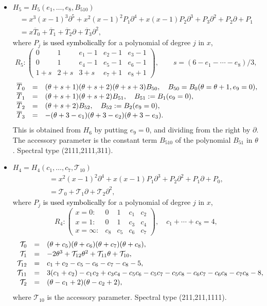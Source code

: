 \documentclass[a4paper,12pt]{article}
\theoremstyle{definition}
\theoremstyle{remark}
\numberwithin{equation}{section} %
\newcommand{\blue}[1]{\textcolor{black}{#1}}
\begin{document}
\begin{itemize}[leftmargin=*]
\item $H_5=H_5(e_1,\dots,e_8,B_{510})$
  $$\begin{array}{l}=x^3(x-1)^3\partial^5+x^2(x-1)^2P_1\partial^4+x(x-1)P_2\partial^3+P_3\partial^2+P_2\partial+P_1\\[2mm]
  =x\overline{T}_0+\overline{T}_1+\overline{T}_2\partial +\overline{T}_3\partial ^2,\end{array}$$
where $P_j$ \blue{is used symbolically} for a polynomial of degree $j$ in $x$,     
\[R_5: \left(\begin{array}{ccccc}
    0&1&e_1-1&e_2-1&e_3-1\\
    0&1&e_4-1&e_5-1&e_6-1\\ 
    1+s&2+s&3+s&e_7+1&e_8+1\end{array}\right),
    \qquad s=(6-e_1-\cdots-e_8)/3,
    \]
\[\def\arraystretch{1.1} \begin{array}{rcl}
   \overline{T}_0 &=& (\theta+s+1)(\theta+s+2)(\theta+s+3)B_{50},\quad B_{50}=B_0(\theta=\theta+1, e_9=0), \\
   \overline{T}_1 &=& (\theta+s+1)(\theta+s+2)B_{51},\quad B_{51}:=B_1(e_9=0),\\
   \overline{T}_2 &=& (\theta+s+2)B_{52},\quad B_{52}:=B_2(e_9=0), \\
   \overline{T}_3 &=& -(\theta+3-e_1)(\theta+3-e_2)(\theta+3-e_3).
\end{array} \]
This is obtained from $H_6$ by putting $e_9=0$,
and dividing from the right by $\partial$. The accessory parameter %
is the constant term $B_{510}$ of the polynomial $B_{51}$ in $\theta$. Spectral type (2111,2111,311).
\item $H_4=H_4(c_1,\dots,c_7,\mathcal T_{10})$
  $$\begin{array}{l}
  =x^2(x-1)^2\partial^4+x(x-1)P_1\partial^3+P_2\partial^2+P_1\partial+P_0,\\[2mm]
  =\mathcal T_0+\mathcal T_1\partial+\mathcal T_2\partial^2,\end{array}$$
  where $P_j$ \blue{is used symbolically} for a polynomial of degree $j$ in $x$,
\[R_4:\left(\begin{array}{llcll}x=0:&0&1&c_1&c_2\\ x=1:&0&1&c_3&c_4\\ x=\infty:&c_8&c_5&c_6&c_7\end{array}\right),\quad c_1+\cdots+c_8=4,\]
 \[\def\arraystretch{1.1} \begin{array}{rcl}
    \mathcal T_0&=&(\theta+c_5)(\theta+c_6)(\theta+c_7)(\theta+c_8),\\
    \mathcal T_1&=&-2\theta^3+\mathcal T_{12}\theta^2+\mathcal T_{11}\theta+\mathcal T_{10},\\
    \mathcal T_{12}&=&c_1+c_2-c_5-c_6-c_7-c_8-5,\\
    \mathcal T_{11}&=&3(c_1+c_2)-c_1c_2+c_3c_4-c_5c_6-c_5c_7-c_5c_8-c_6c_7-c_6c_8-c_7c_8-8,\\
    \mathcal T_2&=&(\theta-c_1+2)(\theta-c_2+2),
 \end{array}
 \]
 where $\mathcal T_{10}$ is the accessory parameter. Spectral type (211,211,1111).


\end{itemize}
\end{document}

